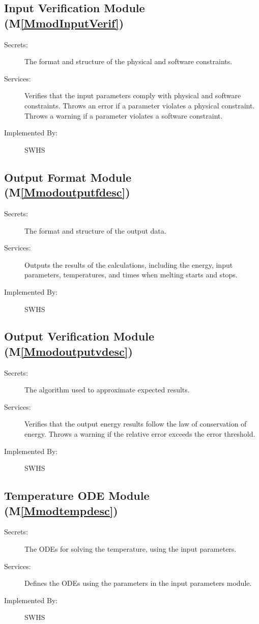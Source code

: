 \documentclass[12pt]{article}
\begin{document}
\subsection{Input Verification Module (M\ref{MmodInputVerif})}
\label{Sec:InpuVeriModu()}
\begin{description}
\item[Secrets:]The format and structure of the physical and software constraints.
\item[Services:]Verifies that the input parameters comply with physical and software constraints. Throws an error if a parameter violates a physical constraint. Throws a warning if a parameter violates a software constraint.
\item[Implemented By:]SWHS
\end{description}
\subsection{Output Format Module (M\ref{Mmodoutputfdesc})}
\label{Sec:OutpFormModu()}
\begin{description}
\item[Secrets:]The format and structure of the output data.
\item[Services:]Outputs the results of the calculations, including the energy, input parameters, temperatures, and times when melting starts and stops.
\item[Implemented By:]SWHS
\end{description}
\subsection{Output Verification Module (M\ref{Mmodoutputvdesc})}
\label{Sec:OutpVeriModu()}
\begin{description}
\item[Secrets:]The algorithm used to approximate expected results.
\item[Services:]Verifies that the output energy results follow the law of conservation of energy. Throws a warning if the relative error exceeds the error threshold.
\item[Implemented By:]SWHS
\end{description}
\subsection{Temperature ODE Module (M\ref{Mmodtempdesc})}
\label{Sec:TempODEModu()}
\begin{description}
\item[Secrets:]The ODEs for solving the temperature, using the input parameters.
\item[Services:]Defines the ODEs using the parameters in the input parameters module.
\item[Implemented By:]SWHS
\end{description}
\end{document}
